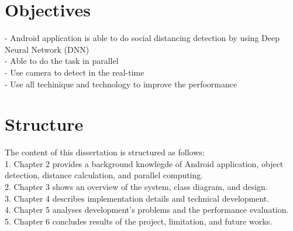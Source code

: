    \section{Objectives}
        -	Android application is able to do social distancing detection by using Deep Neural Network (DNN) \\
        -	Able to do the task in parallel \\
        -	Use camera to detect in the real-time \\
        -   Use all techinique and technology to improve the perfoormance \\

    \section{Structure}
        The content of this dissertation is structured as follows: \\
        1.	Chapter 2 provides a background knowlegde of Android application, object detection, distance calculation, and parallel computing. \\
        2.	Chapter 3 shows an overview of the system, class diagram, and design.  \\
        3.	Chapter 4 describes implementation details and technical development. \\
        4.	Chapter 5 analyses development's problems and the performance evaluation. \\
        5.	Chapter 6 concludes results of the project, limitation, and future works.  \\
